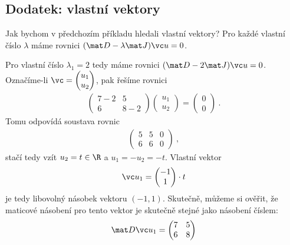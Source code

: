 \subsection*{Dodatek: vlastní vektory}

\begin{example}
    Jak bychom v předchozím příkladu hledali vlastní vektory? Pro každé vlastní číslo $\lambda$ máme rovnici $ (\mat D - \lambda \mat J) \vc u = 0$.
    
    Pro vlastní číslo $\lambda_1 = 2$ tedy máme rovnici $(\mat D - 2 \mat J) \vc u = 0$. Označíme-li $\vc = \begin{pmatrix}
        u_1 \\ u_2
    \end{pmatrix}$, pak řešíme rovnici
    \begin{align}
        \begin{pmatrix}
            7-2 & 5 \\ 6 & 8-2
        \end{pmatrix}
        \begin{pmatrix}
            u_1 \\ u_2
        \end{pmatrix}
        =
        \begin{pmatrix}
            0 \\ 0
        \end{pmatrix} \:.
    \end{align}
    Tomu odpovídá soustava rovnic
    \begin{align}
        \left(\begin{array}{cc|c}
            5 & 5 & 0 \\
            6 & 6 & 0
        \end{array} \right) \:,
    \end{align}
    stačí tedy vzít $u_2 = t \in \R$ a $u_1 = - u_2 = -t$. Vlastní vektor
    \begin{align}
        \vc u_1 = \begin{pmatrix}
            -1 \\ 1
        \end{pmatrix} \cdot t
    \end{align}
    je tedy libovolný násobek vektoru $(-1,1)$. Skutečně, můžeme si ověřit, že maticové násobení pro tento vektor je skutečně stejné jako násobení číslem:
    \begin{align}
        \mat D \vc u_1 = \begin{pmatrix}
            7 & 5 \\ 6 & 8

\end{pmatrix}
\end{align}
\end{example}

